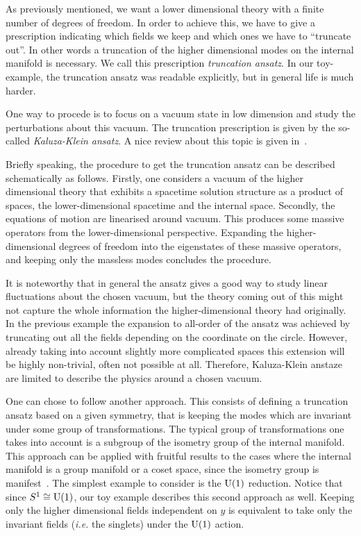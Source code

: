 \documentclass[debug]{phd}
\begin{document}
				As previously mentioned, we want a lower dimensional theory with a finite number of degrees of freedom.
				In order to achieve this, we have to give a prescription indicating which fields we keep and which ones we have to ``truncate out''.
				In other words a truncation of the higher dimensional modes on the internal manifold is necessary.
				We call this prescription \emph{truncation ansatz}.
				In our toy-example, the truncation ansatz was readable explicitly, but in general life is much harder.
			
				One way to procede is to focus on a vacuum state in low dimension and study the perturbations about this vacuum.
				The truncation prescription is given by the so-called \emph{Kaluza-Klein ansatz}.
				A nice review about this topic is given in~\cite{duffKK}.
			
				Briefly speaking, the procedure to get the truncation ansatz can be described schematically as follows.
				Firstly, one considers a vacuum of the higher dimensional theory that exhibits a spacetime solution structure as a product of spaces, the lower-dimensional spacetime and the internal space.
				Secondly, the equations of motion are linearised around vacuum.
				This produces some massive operators from the lower-dimensional perspective.
				Expanding the higher-dimensional degrees of freedom into the eigenstates of these massive operators, and keeping only the massless modes concludes the procedure.
			
				It is noteworthy that in general the ansatz gives a good way to study linear fluctuations about the chosen vacuum, but the theory coming out of this might not capture the whole information the higher-dimensional theory had originally.
				In the previous example the expansion to all-order of the ansatz was achieved by truncating out all the fields depending on the coordinate on the circle.
				However, already taking into account slightly more complicated spaces this extension will be highly non-trivial, often not possible at all.
				Therefore, Kaluza-Klein anstaze are limited to describe the physics around a chosen vacuum.
			
				One can chose to follow another approach.
				This consists of defining a truncation ansatz based on a given symmetry, that is keeping the modes which are invariant under some group of transformations.
				The typical group of transformations one takes into account is a subgroup of the isometry group of the internal manifold.
				This approach can be applied with fruitful results to the cases where the internal manifold is a group manifold or a coset space, since the isometry group is manifest~\cite{Cvetic:2003jy, schschw}.
				The simplest example to consider is the $\mathrm{U}(1)$ reduction.
				Notice that since $S^1 \cong \mathrm{U}(1)$, our toy example describes this second approach as well.
				Keeping only the higher dimensional fields independent on $y$ is equivalent to take only the invariant fields (\emph{i.e.} the singlets) under the $\mathrm{U}(1)$ action.
			
\end{document}
